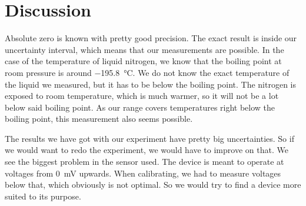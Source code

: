 \section{Discussion}

Absolute zero is known with pretty good precision.
The exact result is inside our uncertainty interval, which means that our measurements are possible.
In the case of the temperature of liquid nitrogen, we know that the boiling point at room pressure is around \SI{-195.8}{\degreeCelsius}.
We do not know the exact temperature of the liquid we measured, but it has to be below the boiling point.
The nitrogen is exposed to room temperature, which is much warmer, so it will not be a lot below said boiling point.
As our range covers temperatures right below the boiling point, this measurement also seems possible.

The results we have got with our experiment have pretty big uncertainties.
So if we would want to redo the experiment, we would have to improve on that.
We see the biggest problem in the sensor used.
The device is meant to operate at voltages from \SI{0}{\milli\volt} upwards.
When calibrating, we had to measure voltages below that, which obviously is not optimal.
So we would try to find a device more suited to its purpose.